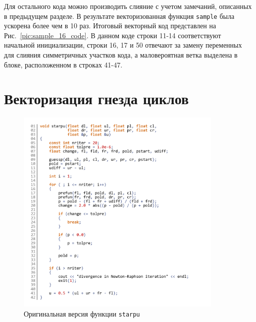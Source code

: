 \documentclass[utf8]{psta}
\begin{document}
Для остального кода можно производить слияние с учетом замечаний, описанных в предыдущем разделе.
В результате векторизованная функция \texttt{sample} была ускорена более чем в 10 раз.
Итоговый векторный код представлен на Рис.~\ref{pic:sample_16_code}.
В данном коде строки 11-14 соответствуют начальной инициализации, строки 16, 17 и 50 отвечают за замену переменных для слияния симметричных участков кода, а маловероятная ветка выделена в блоке, расположенном в строках 41-47.

\section{Векторизация гнезда циклов}

\begin{figure}
\includegraphics[width=10cm]{pics/pic_starpu_code}
\caption{Оригинальная версия функции \texttt{starpu}}
\label{pic:starpu_code}
\end{figure}
\end{document}
